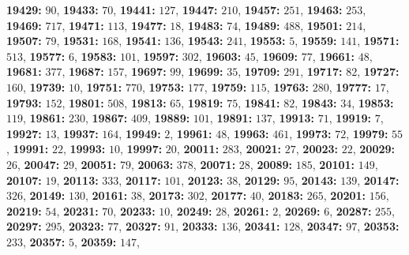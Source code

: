 \textsf{\bfseries 19429:} $90$, \textsf{\bfseries 19433:} $70$, \textsf{\bfseries 19441:} $127$, \textsf{\bfseries 19447:} $210$, \textsf{\bfseries 19457:} $251$, \textsf{\bfseries 19463:} $253$, \textsf{\bfseries 19469:} $717$, \textsf{\bfseries 19471:} $113$, \textsf{\bfseries 19477:} $18$, \textsf{\bfseries 19483:} $74$, \textsf{\bfseries 19489:} $488$, \textsf{\bfseries 19501:} $214$, \textsf{\bfseries 19507:} $79$, \textsf{\bfseries 19531:} $168$, \textsf{\bfseries 19541:} $136$, \textsf{\bfseries 19543:} $241$, \textsf{\bfseries 19553:} $5$, \textsf{\bfseries 19559:} $141$, \textsf{\bfseries 19571:} $513$, \textsf{\bfseries 19577:} $6$, \textsf{\bfseries 19583:} $101$, \textsf{\bfseries 19597:} $302$, \textsf{\bfseries 19603:} $45$, \textsf{\bfseries 19609:} $77$, \textsf{\bfseries 19661:} $48$, \textsf{\bfseries 19681:} $377$, \textsf{\bfseries 19687:} $157$, \textsf{\bfseries 19697:} $99$, \textsf{\bfseries 19699:} $35$, \textsf{\bfseries 19709:} $291$, \textsf{\bfseries 19717:} $82$, \textsf{\bfseries 19727:} $160$, \textsf{\bfseries 19739:} $10$, \textsf{\bfseries 19751:} $770$, \textsf{\bfseries 19753:} $177$, \textsf{\bfseries 19759:} $115$, \textsf{\bfseries 19763:} $280$, \textsf{\bfseries 19777:} $17$, \textsf{\bfseries 19793:} $152$, \textsf{\bfseries 19801:} $508$, \textsf{\bfseries 19813:} $65$, \textsf{\bfseries 19819:} $75$, \textsf{\bfseries 19841:} $82$, \textsf{\bfseries 19843:} $34$, \textsf{\bfseries 19853:} $119$, \textsf{\bfseries 19861:} $230$, \textsf{\bfseries 19867:} $409$, \textsf{\bfseries 19889:} $101$, \textsf{\bfseries 19891:} $137$, \textsf{\bfseries 19913:} $71$, \textsf{\bfseries 19919:} $7$, \textsf{\bfseries 19927:} $13$, \textsf{\bfseries 19937:} $164$, \textsf{\bfseries 19949:} $2$, \textsf{\bfseries 19961:} $48$, \textsf{\bfseries 19963:} $461$, \textsf{\bfseries 19973:} $72$, \textsf{\bfseries 19979:} $55$, \textsf{\bfseries 19991:} $22$, \textsf{\bfseries 19993:} $10$, \textsf{\bfseries 19997:} $20$, \textsf{\bfseries 20011:} $283$, \textsf{\bfseries 20021:} $27$, \textsf{\bfseries 20023:} $22$, \textsf{\bfseries 20029:} $26$, \textsf{\bfseries 20047:} $29$, \textsf{\bfseries 20051:} $79$, \textsf{\bfseries 20063:} $378$, \textsf{\bfseries 20071:} $28$, \textsf{\bfseries 20089:} $185$, \textsf{\bfseries 20101:} $149$, \textsf{\bfseries 20107:} $19$, \textsf{\bfseries 20113:} $333$, \textsf{\bfseries 20117:} $101$, \textsf{\bfseries 20123:} $38$, \textsf{\bfseries 20129:} $95$, \textsf{\bfseries 20143:} $139$, \textsf{\bfseries 20147:} $326$, \textsf{\bfseries 20149:} $130$, \textsf{\bfseries 20161:} $38$, \textsf{\bfseries 20173:} $302$, \textsf{\bfseries 20177:} $40$, \textsf{\bfseries 20183:} $265$, \textsf{\bfseries 20201:} $156$, \textsf{\bfseries 20219:} $54$, \textsf{\bfseries 20231:} $70$, \textsf{\bfseries 20233:} $10$, \textsf{\bfseries 20249:} $28$, \textsf{\bfseries 20261:} $2$, \textsf{\bfseries 20269:} $6$, \textsf{\bfseries 20287:} $255$, \textsf{\bfseries 20297:} $295$, \textsf{\bfseries 20323:} $77$, \textsf{\bfseries 20327:} $91$, \textsf{\bfseries 20333:} $136$, \textsf{\bfseries 20341:} $128$, \textsf{\bfseries 20347:} $97$, \textsf{\bfseries 20353:} $233$, \textsf{\bfseries 20357:} $5$, \textsf{\bfseries 20359:} $147$, 

